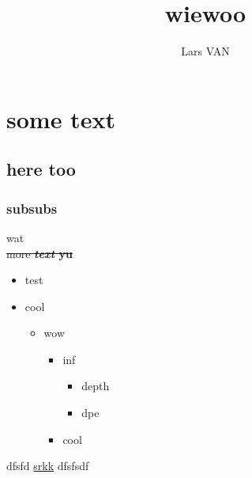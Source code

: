 \documentclass[a4paper,12pt]{article}
\author{Lars VAN}
\begin{document}
\title{wiewoo}
\maketitle
\newpage
\section{some text}
\subsection{here too}
\subsubsection{subsubs}
wat
 \\ 
\sout{more \textbf{\textit{text} yu}}
 \\ 
\begin{itemize}
\item test
\item cool
\begin{itemize}
\item wow
\begin{itemize}
\item inf
\begin{itemize}
\item depth
\item dpe
\end{itemize}
\item cool
\end{itemize}
\end{itemize}
\end{itemize}
dfsfd \href{https://beaversinfos.weebly.com/}{srkk} dfsfsdf
 \\ 
\end{document}
